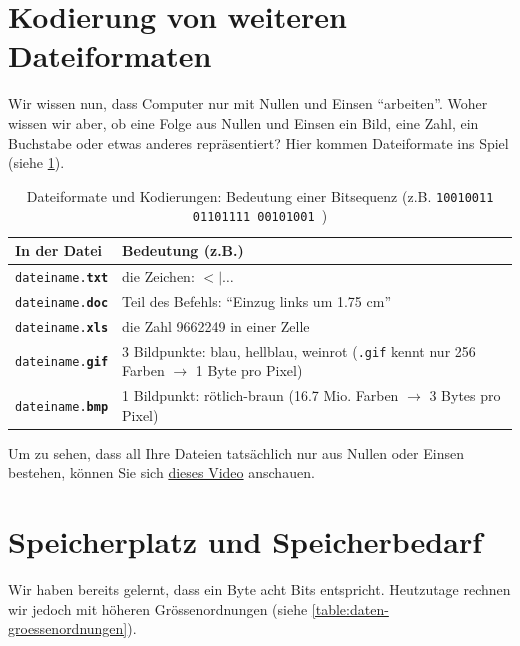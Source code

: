\section{Kodierung von weiteren Dateiformaten}
Wir wissen nun, dass Computer nur mit Nullen und Einsen \enquote{arbeiten}. Woher wissen wir aber, ob eine Folge aus Nullen und Einsen ein Bild, eine Zahl, ein Buchstabe oder etwas anderes repräsentiert? Hier kommen Dateiformate ins Spiel (siehe \cref{table:formats-codes}).

\begin{table}[H]
	\centering
	\begin{tabular}{l|p{11cm}}
		\textbf{In der Datei}           & \textbf{Bedeutung (z.B.)}                                                                                 \\\midrule
		\texttt{dateiname.\textbf{txt}} & die Zeichen: $<|\ldots$                                                                                   \\
		\texttt{dateiname.\textbf{doc}} & Teil des Befehls: \enquote{Einzug links um 1.75 cm}                                                       \\
		\texttt{dateiname.\textbf{xls}} & die Zahl 9662249 in einer Zelle                                                                           \\
		\texttt{dateiname.\textbf{gif}} & 3 Bildpunkte: blau, hellblau, weinrot (\texttt{.gif} kennt nur 256 Farben $\rightarrow$ 1 Byte pro Pixel) \\
		\texttt{dateiname.\textbf{bmp}} & 1 Bildpunkt: rötlich-braun (16.7 Mio. Farben $\rightarrow$ 3 Bytes pro Pixel)
	\end{tabular}
	\caption{Dateiformate und Kodierungen: Bedeutung einer Bitsequenz (z.B. \texttt{10010011   01101111   00101001
		})}
	\label{table:formats-codes}
\end{table}

\begin{myexercise}
	Um zu sehen, dass all Ihre Dateien tatsächlich nur aus Nullen oder Einsen bestehen, können Sie sich \href{https://moodle.ksimlee.ch/pluginfile.php/56580/mod_lesson/page_contents/2836/VideoXxdDemo.mov}{dieses Video} anschauen.
\end{myexercise}


\section{Speicherplatz und Speicherbedarf}
Wir haben bereits gelernt, dass ein Byte acht Bits entspricht. Heutzutage rechnen wir jedoch mit höheren Grössenordnungen (siehe \cref{table:daten-groessenordnungen}).

